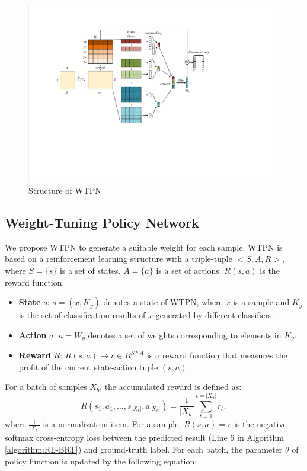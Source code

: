 \documentclass[review]{elsarticle}
\begin{document}
\begin{figure}[tbp]
	\hspace{0ex}
	\vspace{0ex}
	\centering
	\includegraphics[width = \textwidth]{WTPN}
	\caption{Structure of WTPN}
	\label{fig:WTPN}
\end{figure}

\subsection{Weight-Tuning Policy Network}
We propose WTPN to generate a suitable weight for each sample. WTPN is based on a reinforcement learning structure with a triple-tuple $<S, A, R>$, where $S = \{ s \}$ is a set of states. $A = \{ a \}$ is a set of actions. $R(s, a)$ is the reward function.
\begin{itemize}
	\item \textbf{State} $s$: $s = ( x, K_y )$ denotes a state of WTPN, where $x$ is a sample and $K_y$ is the set of classification results of $x$ generated by different classifiers.
	
	\item \textbf{Action} $a$: $a = W_y$ denotes a set of weights corresponding to elements in $K_y$.
	
	\item \textbf{Reward} $R$: $R(s, a) \to r \in R^{S * A}$ is a reward function that measures the profit of the current state-action tuple $(s, a)$.
\end{itemize}

For a batch of samples $X_b$, the accumulated reward is defined as:
\begin{equation}
R(s_1, a_1, ..., s_{|X_b|},a_{|X_b|}) = \frac{1}{|X_b|}\sum_{t = 1}^{t = |X_b|} r_t,
\end{equation}
where $ \frac{1}{|X_b|}$ is a normalization item. For a sample, $R(s,a) = r$ is the negative softmax cross-entropy loss between the predicted result (Line 6 in Algorithm \ref{algorithm:RL-BRT}) and ground-truth label.
For each batch, the parameter $\theta$ of policy function is updated by the following equation: 
\end{document}

